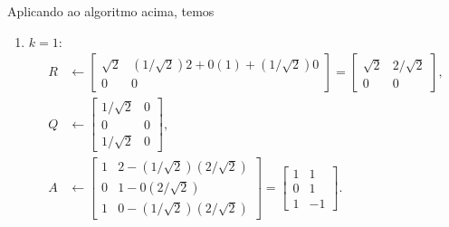 \documentclass[a4paper,12pt, leqno, answers]{exam}
\begin{document}
\begin{questions}
\begin{parts}
\begin{solution}
            Aplicando ao algoritmo acima, temos
            \begin{enumerate}
                \item $k = 1$:
                    \begin{align*}
                        R &\leftarrow \begin{bmatrix}
                            \sqrt{2} & \left( 1 / \sqrt{2} \right) 2 + 0 \left( 1 \right) + \left( 1 / \sqrt{2} \right) 0 \\
                            0 & 0
                        \end{bmatrix} = \begin{bmatrix}
                            \sqrt{2} & 2 / \sqrt{2} \\
                            0 & 0
                        \end{bmatrix}, \\
                        Q &\leftarrow \begin{bmatrix}
                            1 / \sqrt{2} & 0 \\
                            0 & 0 \\
                            1 / \sqrt{2} & 0
                        \end{bmatrix}, \\
                        A &\leftarrow \begin{bmatrix}
                            1 & 2 - \left( 1 / \sqrt{2} \right) \left( 2 / \sqrt{2} \right) \\
                            0 & 1 - 0 \left( 2 / \sqrt{2} \right) \\
                            1 & 0 - \left( 1 / \sqrt{2} \right) \left( 2 / \sqrt{2} \right)
                        \end{bmatrix} = \begin{bmatrix}
                            1 & 1 \\
                            0 & 1 \\
                            1 & -1
                        \end{bmatrix}.
                    \end{align*}


\end{enumerate}
\end{solution}
\end{parts}
\end{questions}
\end{document}
